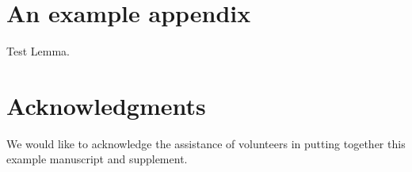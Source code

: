 \documentclass[review,onefignum,onetabnum]{siamart171218}
\begin{document}
%
%
%
%
%
%
%
%
%
%
%
%
%
%

\appendix
\section{An example appendix}


\begin{lemma}
Test Lemma.
\end{lemma}


\section*{Acknowledgments}
We would like to acknowledge the assistance of volunteers in putting
together this example manuscript and supplement.



\end{document}
